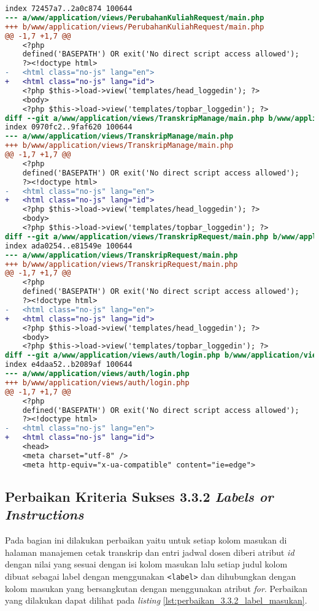 \begin{lstlisting}[frame=single, label={lst:perbaikan_3.1.1_bahasa_halaman}, language=diff, caption=Perbaikan Kriteria Sukses 3.1.1 - Bahasa yang Tidak Sesuai]
index 72457a7..2a0c874 100644
--- a/www/application/views/PerubahanKuliahRequest/main.php
+++ b/www/application/views/PerubahanKuliahRequest/main.php
@@ -1,7 +1,7 @@
    <?php
    defined('BASEPATH') OR exit('No direct script access allowed');
    ?><!doctype html>
-   <html class="no-js" lang="en">
+   <html class="no-js" lang="id">
    <?php $this->load->view('templates/head_loggedin'); ?>
    <body>
    <?php $this->load->view('templates/topbar_loggedin'); ?>
diff --git a/www/application/views/TranskripManage/main.php b/www/application/views/TranskripManage/main.php
index 0970fc2..9faf620 100644
--- a/www/application/views/TranskripManage/main.php
+++ b/www/application/views/TranskripManage/main.php
@@ -1,7 +1,7 @@
    <?php
    defined('BASEPATH') OR exit('No direct script access allowed');
    ?><!doctype html>
-   <html class="no-js" lang="en">
+   <html class="no-js" lang="id">
    <?php $this->load->view('templates/head_loggedin'); ?>
    <body>
    <?php $this->load->view('templates/topbar_loggedin'); ?>
diff --git a/www/application/views/TranskripRequest/main.php b/www/application/views/TranskripRequest/main.php
index ada0254..e81549e 100644
--- a/www/application/views/TranskripRequest/main.php
+++ b/www/application/views/TranskripRequest/main.php
@@ -1,7 +1,7 @@
    <?php
    defined('BASEPATH') OR exit('No direct script access allowed');
    ?><!doctype html>
-   <html class="no-js" lang="en">
+   <html class="no-js" lang="id">
    <?php $this->load->view('templates/head_loggedin'); ?>
    <body>
    <?php $this->load->view('templates/topbar_loggedin'); ?>
diff --git a/www/application/views/auth/login.php b/www/application/views/auth/login.php
index e4daa52..b2089af 100644
--- a/www/application/views/auth/login.php
+++ b/www/application/views/auth/login.php
@@ -1,7 +1,7 @@
    <?php
    defined('BASEPATH') OR exit('No direct script access allowed');
    ?><!doctype html>
-   <html class="no-js" lang="en">
+   <html class="no-js" lang="id">
    <head>
    <meta charset="utf-8" />
    <meta http-equiv="x-ua-compatible" content="ie=edge">
\end{lstlisting}

\subsection{Perbaikan Kriteria Sukses 3.3.2 \textit{Labels or Instructions}}
\label{subsec:perbaikan_kriteria_sukses_3.3.2}
Pada bagian ini dilakukan perbaikan yaitu untuk setiap kolom masukan di halaman manajemen cetak transkrip dan entri jadwal dosen diberi atribut \textit{id} dengan nilai yang sesuai dengan isi kolom masukan lalu setiap judul kolom dibuat sebagai label dengan menggunakan \texttt{<label>} dan dihubungkan dengan kolom masukan yang bersangkutan dengan menggunakan atribut \textit{for}. Perbaikan yang dilakukan dapat dilihat pada \textit{listing} \ref{lst:perbaikan_3.3.2_label_masukan}.

